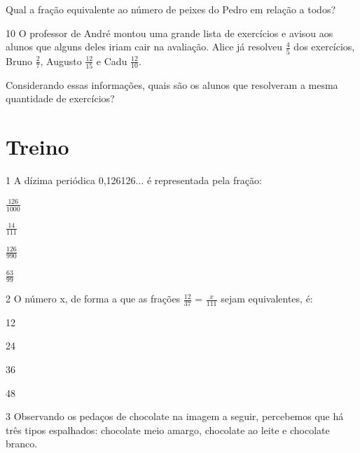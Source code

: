 Qual a fração equivalente ao número de peixes do Pedro em relação a
todos?

\begin{emptybox}
\end{emptybox}

\num{10} O professor de André montou uma grande lista de exercícios 
e avisou aos alunos que alguns deles iriam cair na avaliação. Alice
já resolveu $\frac{4}{5}$ dos exercícios, Bruno $\frac{2}{7}$, Augusto 
$\frac{12}{15}$ e Cadu $\frac{12}{10}$.

Considerando essas informações, quais são os alunos que resolveram a mesma
quantidade de exercícios?


\section{Treino}

\num{1} A dízima periódica 0,126126... é representada pela fração:

\begin{escolha}

\item $\frac{126}{1000}$
\item $\frac{14}{111}$
\item $\frac{126}{990}$
\item $\frac{63}{99}$

\end{escolha}

\num{2} O número x, de forma a que as frações $\frac{12}{37}$ = $\frac{x}{111}$ sejam equivalentes, é:

\begin{escolha}

\item 12
\item 24
\item 36
\item 48

\end{escolha}

\num{3} Observando os pedaços de chocolate na imagem a seguir, percebemos 
que há três tipos espalhados: chocolate meio amargo, chocolate ao leite e
chocolate branco. 

